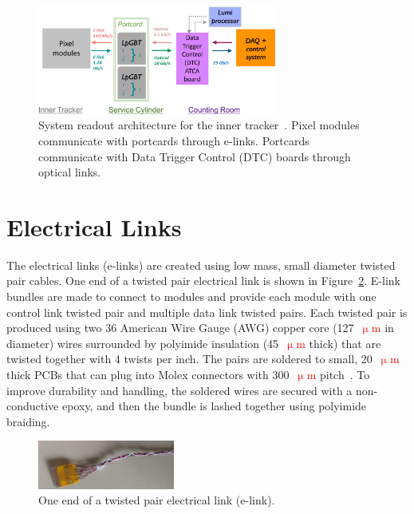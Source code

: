 \documentclass[a4paper,11pt]{article}
\newcommand{\fig}{Figure}
\newcommand{\micron}{\ensuremath{\upmu\mathrm{m}}\xspace}
\newcommand{\red}{\textcolor{red}}
\begin{document}
\begin{figure}[htbp]
\centering
\includegraphics[width=0.70\textwidth,origin=c]{../figures/IT_System_Readout_2-crop.pdf}
\caption{
\label{fig:readout}
System readout architecture for the inner tracker~\cite{ref:orfanelli}. Pixel modules communicate with portcards through e-links. Portcards communicate with Data Trigger Control (DTC) boards through optical links.
}
\end{figure}

\section{Electrical Links}
\label{sec:electrical}


The electrical links (e-links) are created using low mass, small diameter twisted pair cables.
One end of a twisted pair electrical link is shown in \fig~\ref{fig:elink}.
E-link bundles are made to connect to modules and provide each module with one control link twisted pair and multiple data link twisted pairs.
Each twisted pair is produced using two 36 American Wire Gauge (AWG) copper core (127~\red{\micron} in diameter) wires surrounded by polyimide insulation (45~\red{\micron} thick) that are twisted together with 4 twists per inch.
The pairs are soldered to small, 20~\red{\micron} thick PCBs that can plug into Molex connectors with 300~\red{\micron} pitch~\cite{ref:molex45}.
To improve durability and handling, the soldered wires are secured with a non-conductive epoxy, and then the bundle is lashed together using polyimide braiding.

\begin{figure}[htbp]
\centering
\includegraphics[width=0.4\textwidth,origin=c]{../figures/e-link-1.jpg}
\caption{
\label{fig:elink}
One end of a twisted pair electrical link (e-link).
}
\end{figure}
\end{document}

